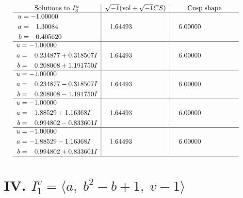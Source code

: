\documentclass[1p]{elsarticle_modified}
\theoremstyle{definition}
\newcommand{\I}{\sqrt{-1}}
\begin{document}
$$\begin{array}{c|c|c}  
\text{Solutions to }I^u_{3}& \I (\text{vol} + \sqrt{-1}CS) & \text{Cusp shape}\\
 \hline 
\begin{aligned}
u &= -1.00000\phantom{ +0.000000I} \\
a &= \phantom{-}1.30084\phantom{ +0.000000I} \\
b &= -0.405620\phantom{ +0.000000I}\end{aligned}
 & \phantom{-}1.64493\phantom{ +0.000000I} & \phantom{-}6.00000\phantom{ +0.000000I} \\ \hline\begin{aligned}
u &= -1.00000\phantom{ +0.000000I} \\
a &= \phantom{-}0.234877 + 0.318507 I \\
b &= \phantom{-}0.208008 + 1.191750 I\end{aligned}
 & \phantom{-}1.64493\phantom{ +0.000000I} & \phantom{-}6.00000\phantom{ +0.000000I} \\ \hline\begin{aligned}
u &= -1.00000\phantom{ +0.000000I} \\
a &= \phantom{-}0.234877 - 0.318507 I \\
b &= \phantom{-}0.208008 - 1.191750 I\end{aligned}
 & \phantom{-}1.64493\phantom{ +0.000000I} & \phantom{-}6.00000\phantom{ +0.000000I} \\ \hline\begin{aligned}
u &= -1.00000\phantom{ +0.000000I} \\
a &= -1.88529 + 1.16368 I \\
b &= \phantom{-}0.994802 - 0.833601 I\end{aligned}
 & \phantom{-}1.64493\phantom{ +0.000000I} & \phantom{-}6.00000\phantom{ +0.000000I} \\ \hline\begin{aligned}
u &= -1.00000\phantom{ +0.000000I} \\
a &= -1.88529 - 1.16368 I \\
b &= \phantom{-}0.994802 + 0.833601 I\end{aligned}
 & \phantom{-}1.64493\phantom{ +0.000000I} & \phantom{-}6.00000\phantom{ +0.000000I}\\
 \hline 
 \end{array}$$\newpage\newpage\renewcommand{\arraystretch}{1}
\centering \section*{IV. $I^v_{1}= \langle a,\;b^2- b+1,\;v-1 \rangle$}
\end{document}
